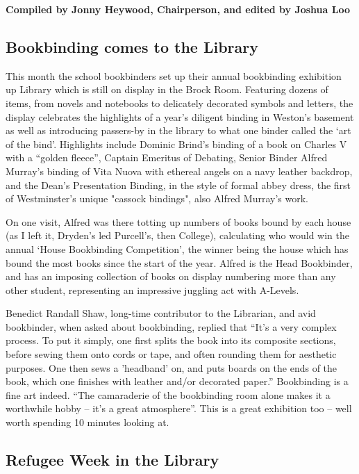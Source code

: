\textbf{Compiled by Jonny Heywood, Chairperson, and edited by Joshua Loo}

\subsection{Bookbinding comes to the Library}

This month the school bookbinders set up their annual bookbinding exhibition up Library which is still on display in the Brock Room. Featuring dozens of items, from novels and notebooks to delicately decorated symbols and letters, the display celebrates the highlights of a year’s diligent binding in Weston’s basement as well as introducing passers-by in the library to what one binder called the ‘art of the bind’. Highlights include Dominic Brind’s binding of a book on Charles V with a “golden fleece”, Captain Emeritus of Debating, Senior Binder Alfred Murray’s binding of Vita Nuova with ethereal angels on a navy leather backdrop, and the Dean's Presentation Binding, in the style of formal abbey dress, the first of Westminster's unique "cassock bindings", also Alfred Murray’s work.

On one visit, Alfred was there totting up numbers of books bound by each house (as I left it, Dryden’s led Purcell’s, then College), calculating who would win the annual ‘House Bookbinding Competition’, the winner being the house which has bound the most books since the start of the year. Alfred is the Head Bookbinder, and has an imposing collection of books on display numbering more than any other student, representing an impressive juggling act with A-Levels.

Benedict Randall Shaw, long-time contributor to the Librarian, and avid bookbinder, when asked about bookbinding, replied that “It’s a very complex process. To put it simply, one first splits the book into its composite sections, before sewing them onto cords or tape, and often rounding them for aesthetic purposes. One then sews a 'headband' on, and puts boards on the ends of the book, which one finishes with leather and/or decorated paper.” Bookbinding is a fine art indeed. “The camaraderie of the bookbinding room alone makes it a worthwhile hobby – it’s a great atmosphere”. This is a great exhibition too – well worth spending 10 minutes looking at.

\subsection{Refugee Week in the Library}

